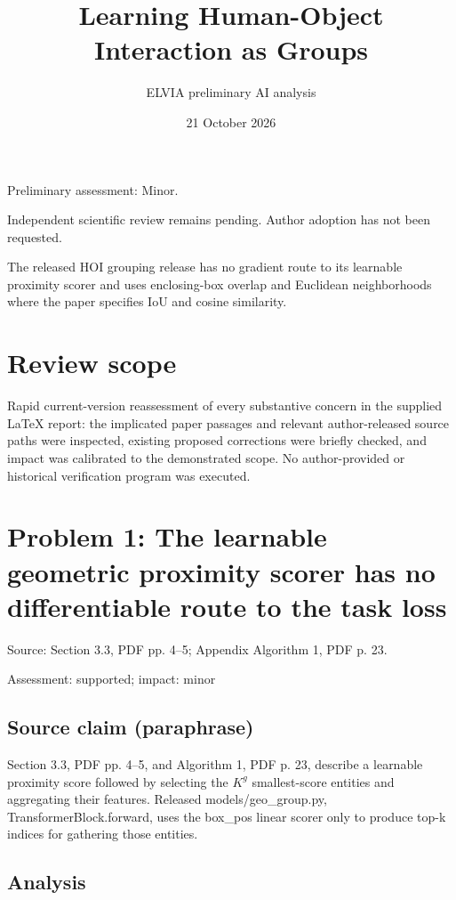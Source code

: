 \documentclass[11pt]{article}
\begin{document}
\title{Learning Human-Object Interaction as Groups}

\author{ELVIA preliminary AI analysis}\date{21 October 2026}\maketitle

Preliminary assessment: Minor.\par

Independent scientific review remains pending. Author adoption has not been requested.

The released HOI grouping release has no gradient route to its learnable proximity scorer and uses enclosing-box overlap and Euclidean neighborhoods where the paper specifies IoU and cosine similarity.

\section*{Review scope}

Rapid current-version reassessment of every substantive concern in the supplied LaTeX report: the implicated paper passages and relevant author-released source paths were inspected, existing proposed corrections were briefly checked, and impact was calibrated to the demonstrated scope. No author-provided or historical verification program was executed.

\section*{Problem 1: The learnable geometric proximity scorer has no differentiable route to the task loss}

Source: Section 3.3, PDF pp. 4–5; Appendix Algorithm 1, PDF p. 23.

Assessment: supported; impact: minor

\subsection*{Source claim (paraphrase)}

Section 3.3, PDF pp. 4–5, and Algorithm 1, PDF p. 23, describe a learnable proximity score followed by selecting the \(K^g\) smallest-score entities and aggregating their features. Released models/geo\_group.py, TransformerBlock.forward, uses the box\_pos linear scorer only to produce top-k indices for gathering those entities.

\subsection*{Analysis}
\end{document}
